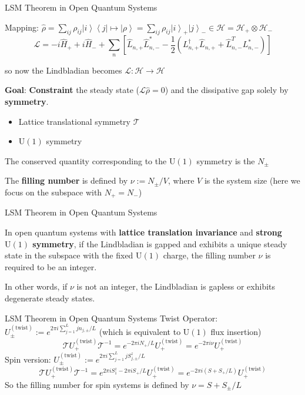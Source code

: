 \documentclass[professionalfont]{beamer}
\theoremstyle{definition}
\newcommand{\lr}[1]{\left(#1\right)}
\newcommand{\lrm}[1]{\left[#1\right]}
\newcommand{\ket}[1]{\left| #1 \right\rangle}
\newcommand{\bra}[1]{\left\langle #1 \right|}
\newcommand{\mrm}[1]{\mathrm{#1}}
\begin{document}
\begin{frame}{LSM Theorem in Open Quantum Systems}

Mapping: $\hat{\rho} = \sum_{ij}\rho_{ij}\ket{i}\bra{j}\mapsto \ket{\rho} = \sum_{ij}\rho_{ij}\ket{i}_+\ket{j}_-\in \mathcal{H}=\mathcal{H}_+\otimes\mathcal{H}_-$
\vspace{0.1cm}
{\footnotesize\[\mathcal{L} = -i\hat{H}_+ + i\hat{H}_- + \sum_{n}\lrm{\hat{L}_{n,+}\hat{L}^*_{n,-} - \frac{1}{2}\lr{L^\dagger_{n,+}\hat{L}_{n,+} + \hat{L}^T_{n,-}L^*_{n,-}}}\]}

so now the Lindbladian becomes $\mathcal{L}:\mathcal{H}\to\mathcal{H}$


\vspace{0.3cm}

\textbf{Goal}: \textbf{Constraint} the steady state ($\mathcal{L}\hat{\rho}=0$) and the dissipative gap solely by \textbf{symmetry}.

\begin{itemize}
    \item Lattice translational symmetry $\mathcal{T}$
    \item $\mrm{U(1)}$ symmetry 
\end{itemize}

\vspace{0.3cm}

The conserved quantity corresponding to the $\mrm{U(1)}$ symmetry is the $N_{\pm}$

The \textbf{filling number} is defined by $\nu := N_{\pm}/V$, where $V$ is the system size (here we focus on the subspace with $N_+ = N_-$)

\end{frame}
\begin{frame}{LSM Theorem in Open Quantum Systems}
\begin{theorem}
    In open quantum systems with \textbf{lattice translation invariance} and \textbf{strong $\mrm{U(1)}$ symmetry}, if the Lindbladian is gapped and exhibits a unique steady state in the subspace with the fixed $\mrm{U(1)}$ charge, the filling number $\nu$ is required to be an integer.
\end{theorem}
In other words, if $\nu$ is not an integer, the Lindbladian is gapless or exhibits degenerate steady states.
\end{frame}
\begin{frame}{LSM Theorem in Open Quantum Systems}
    Twist Operator: $U^{(\mrm{twist})}_\pm := e^{2\pi i \sum_{j=1}^{L}jn_{j,\pm}/L}$ (which is equivalent to $\mrm{U(1)}$ flux insertion)
    \[\mathcal{T}U_+^{(\mrm{twist})}\mathcal{T}^{-1} = e^{-2\pi i N_+/L}U_+^{(\mrm{twist})} = e^{-2\pi i \nu}U_+^{(\mrm{twist})}\]
    Spin version: $U^{(\mrm{twist})}_\pm := e^{2\pi i \sum_{j=1}^{L}jS^z_{j,\pm}/L}$
    \[\mathcal{T}U_+^{(\mrm{twist})}\mathcal{T}^{-1} = e^{2\pi iS_1^z-2\pi i S_+/L}U_+^{(\mrm{twist})} = e^{-2\pi i (S+S_+/L)}U_+^{(\mrm{twist})}\]
    So the filling number for spin systems is defined by $\nu = S + S_\pm/L$
    \vspace{0.2cm}
 
\end{frame}
\end{document}
